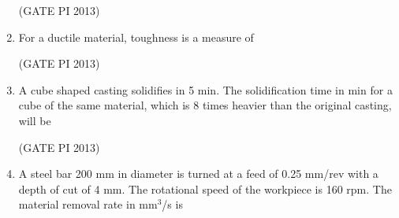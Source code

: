 \documentclass[journal,12pt,onecolumn]{IEEEtran}
\theoremstyle{remark}
\begin{document}
\begin{enumerate}
\begin{enumerate}
\end{enumerate}

\hfill (GATE PI 2013)

\item For a ductile material, toughness is a measure of
\begin{enumerate}
\end{enumerate}

\hfill (GATE PI 2013)

\item A cube shaped casting solidifies in 5 min. The solidification time in min for a cube of the same material, which is 8 times heavier than the original casting, will be 

\begin{enumerate}
\end{enumerate}

\hfill (GATE PI 2013)

\item A steel bar 200 mm in diameter is turned at a feed of 0.25 mm/rev with a depth of cut of 4 mm. The rotational speed of the workpiece is 160 rpm. The material removal rate in mm$^3$/s is 

\begin{enumerate}
\end{enumerate}


\end{enumerate}
\end{document}
